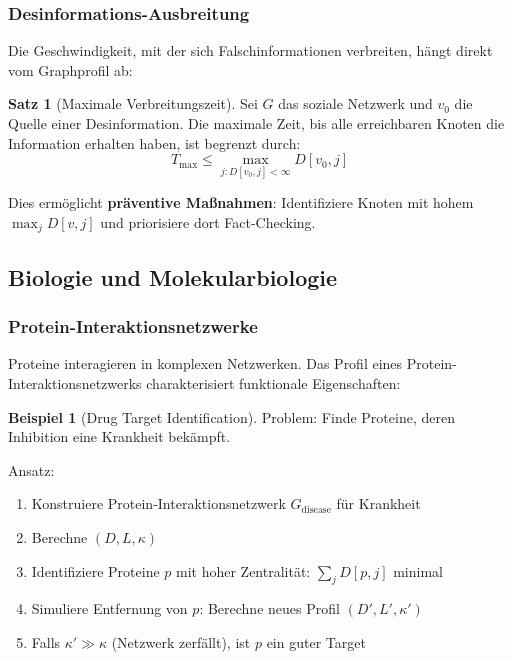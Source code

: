 ﻿\documentclass[a4paper,12pt]{article}
\theoremstyle{definition}
\newtheorem{beispiel}{Beispiel}
\newtheorem{satz}{Satz}
\begin{document}
	\subsubsection{Desinformations-Ausbreitung}
	
	Die Geschwindigkeit, mit der sich Falschinformationen verbreiten, hängt direkt vom Graphprofil ab:
	
	\begin{satz}[Maximale Verbreitungszeit]
		Sei $G$ das soziale Netzwerk und $v_0$ die Quelle einer Desinformation. Die maximale Zeit, bis alle erreichbaren Knoten die Information erhalten haben, ist begrenzt durch:
		\[
		T_{\max} \leq \max_{j: D[v_0,j] < \infty} D[v_0, j]
		\]
	\end{satz}
	
	Dies ermöglicht \textbf{präventive Maßnahmen}: Identifiziere Knoten mit hohem $\max_j D[v,j]$ und priorisiere dort Fact-Checking.
	
	\subsection{Biologie und Molekularbiologie}
	
	\subsubsection{Protein-Interaktionsnetzwerke}
	
	Proteine interagieren in komplexen Netzwerken. Das Profil eines Protein-Interaktions\-netzwerks charakterisiert funktionale Eigenschaften:
	
	\begin{beispiel}[Drug Target Identification]
		Problem: Finde Proteine, deren Inhibition eine Krankheit bekämpft.
		
		Ansatz:
		\begin{enumerate}
			\item Konstruiere Protein-Interaktionsnetzwerk $G_{\text{disease}}$ für Krankheit
			\item Berechne $(D, L, \kappa)$
			\item Identifiziere Proteine $p$ mit hoher Zentralität: $\sum_j D[p,j]$ minimal
			\item Simuliere Entfernung von $p$: Berechne neues Profil $(D', L', \kappa')$
			\item Falls $\kappa' \gg \kappa$ (Netzwerk zerfällt), ist $p$ ein guter Target
		\end{enumerate}
	\end{beispiel}
	
\end{document}
